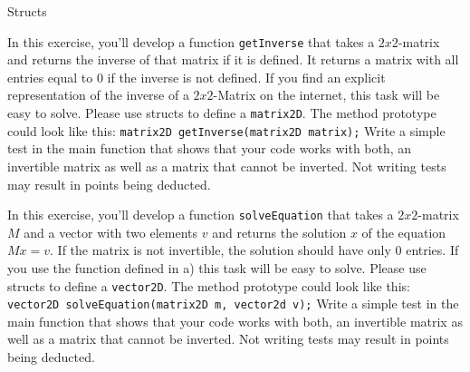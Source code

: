 \documentclass[12pt,a4paper]{scrartcl}
\begin{document}
\newpage

\begin{aufgabe}[4]{Structs}
    \begin{teilaufgabe}[2]
        In this exercise, you'll develop a function \texttt{getInverse} that takes a $2x2$-matrix and returns the inverse of that matrix if it is defined. It returns a matrix with all entries equal to 0 if the inverse is not defined. If you find an explicit representation of the inverse of a $2x2$-Matrix on the internet, this task will be easy to solve. Please use structs to define a \texttt{matrix2D}. The method prototype could look like this:
    \newline
    \newline \texttt{matrix2D getInverse(matrix2D matrix);}
    \newline
    \newline Write a simple test in the main function that shows that your code works with both, an invertible matrix as well as a matrix that cannot be inverted. Not writing tests may result in points being deducted.
    \end{teilaufgabe}
    
    \begin{teilaufgabe}[2]
        In this exercise, you'll develop a function \texttt{solveEquation} that takes a $2x2$-matrix $M$ and a vector with two elements $v$ and returns the solution $x$ of the equation $Mx = v$. If the matrix is not invertible, the solution should have only 0 entries. If you use the function defined in a) this task will be easy to solve. Please use structs to define a \texttt{vector2D}. The method prototype could look like this:
    \newline
    \newline \texttt{vector2D solveEquation(matrix2D m, vector2d v);}
    \newline
    \newline Write a simple test in the main function that shows that your code works with both, an invertible matrix as well as a matrix that cannot be inverted. Not writing tests may result in points being deducted.
    \end{teilaufgabe}
\end{aufgabe}

\newpage
\end{document}
